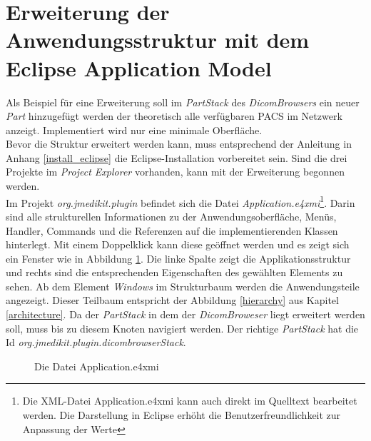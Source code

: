 \section{Erweiterung der Anwendungsstruktur mit dem Eclipse Application Model}
Als Beispiel für eine Erweiterung soll im \textit{PartStack} des \textit{DicomBrowsers} ein neuer \textit{Part} hinzugefügt werden der theoretisch alle verfügbaren PACS im Netzwerk anzeigt. Implementiert wird nur eine minimale Oberfläche.\\
Bevor die Struktur erweitert werden kann, muss entsprechend der Anleitung in Anhang \ref{install_eclipse} die Eclipse-Installation vorbereitet sein. Sind die drei Projekte im \textit{Project Explorer} vorhanden, kann mit der Erweiterung begonnen werden.\\
Im Projekt \textit{org.jmedikit.plugin} befindet sich die Datei \textit{Application.e4xmi}\footnote{Die XML-Datei Application.e4xmi kann auch direkt im Quelltext bearbeitet werden. Die Darstellung in Eclipse erhöht die Benutzerfreundlichkeit zur Anpassung der Werte}. Darin sind alle strukturellen Informationen zu der Anwendungsoberfläche, Menüs, Handler, Commands und die Referenzen auf die implementierenden Klassen hinterlegt. Mit einem Doppelklick kann diese geöffnet werden und es zeigt sich ein Fenster wie in Abbildung \ref{e4xmi}. Die linke Spalte zeigt die Applikationsstruktur und rechts sind die entsprechenden Eigenschaften des gewählten Elements zu sehen. Ab dem Element \textit{Windows} im Strukturbaum werden die Anwendungsteile angezeigt. Dieser Teilbaum entspricht der Abbildung \ref{hierarchy} aus Kapitel \ref{architecture}. Da der \textit{PartStack} in dem der \textit{DicomBroweser} liegt erweitert werden soll, muss bis zu diesem Knoten navigiert werden. Der richtige \textit{PartStack} hat die Id \textit{org.jmedikit.plugin.dicombrowserStack}.
\begin{figure}[H]
  \vspace{0.5cm}
  \centering
   \caption{Die Datei Application.e4xmi}
  \label{e4xmi}
  \vspace{0.5cm}
\end{figure}

